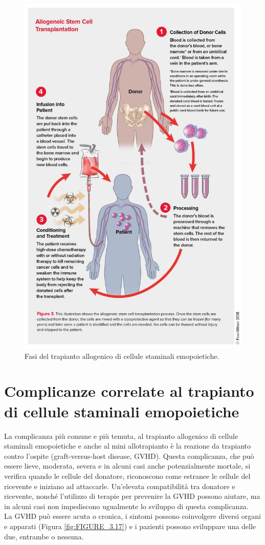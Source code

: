 \begin{figure}[H]
    \begin{center}
    \includegraphics[width=0.7\columnwidth]{img/ALLOGENICO.jpg}
    \vspace{-3mm}
    \end{center}
    \caption{Fasi del trapianto allogenico di cellule staminali emopoietiche.
    \cite{LLSBLOOD}}
    \label{fig:FIGURE_3.10}
\end{figure}

\section{Complicanze correlate al trapianto di cellule staminali emopoietiche}

La complicanza più comune e più temuta, al trapianto allogenico di cellule staminali emopoietiche e anche al mini 
allotrapianto è la reazione da trapianto contro l’ospite (graft-versus-host disease, GVHD)\cite{LLSBLOOD}. Questa complicanza, 
che può essere lieve, moderata, severa e in alcuni casi anche potenzialmente mortale, si verifica quando le cellule 
del donatore, riconoscono come estranee le cellule del ricevente e iniziano ad attaccarle. Un’elevata compatibilità 
tra donatore e ricevente, nonché l’utilizzo di terapie per prevenire la GVHD possono aiutare, ma in alcuni casi non 
impediscono ugualmente lo sviluppo di questa complicanza\cite{LLSBLOOD}.\\ 
La GVHD può essere acuta o cronica, i sintomi possono coinvolgere diversi organi e apparati (Figura \ref*{fig:FIGURE_3.17})
e i pazienti possono sviluppare una delle due, entrambe o nessuna\cite{LLSBLOOD}.

